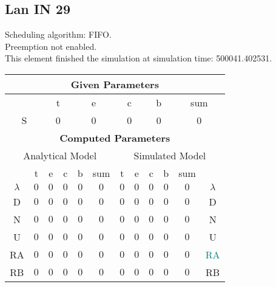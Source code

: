 \documentclass{article}
\begin{document}
\subsection{Lan IN 29}
Scheduling algorithm: FIFO.\\Preemption not enabled. \\This element finished the simulation at simulation time: 500041.402531.\\
\begin{table}[H]\centering\begin{tabular}{@{}c|cccc|c||cccc|c|c@{}}\toprule\multicolumn{12}{c}{\textbf{Given Parameters}}\\\midrule\multicolumn{2}{c|}{ } & \multicolumn{2}{c}{t} & \multicolumn{2}{c}{e} & \multicolumn{2}{c}{c} & \multicolumn{2}{c}{b} & \multicolumn{2}{|c}{sum} \\ \midrule\multicolumn{2}{c|}{S} & \multicolumn{2}{c}{0} & \multicolumn{2}{c}{0} & \multicolumn{2}{c}{0} & \multicolumn{2}{c}{0} & \multicolumn{2}{|c}{0}\\ \midrule\midrule\multicolumn{12}{c}{\textbf{Computed Parameters}}\\ \midrule\multicolumn{6}{c||}{Analytical Model} & \multicolumn{6}{c}{Simulated Model}\\ 
 \midrule & t & e & c & b & sum & t & e & c & b & sum &  \\ \midrule$\lambda$ &$0$ & $0$ & $0$ & $0$ & $0$ & $0$ & $0$ & $0$ & $0$ & $0$& $\lambda$ \\D & $0$ & $0$ & $0$ & $0$ & $0$ & $0$ & $0$ & $0$ & $0$ & $0$& D\\N & $0$ & $0$ & $0$ & $0$ & $0$ & $0$ & $0$ & $0$ & $0$ & $0$& N\\U & $0$ & $0$ & $0$ & $0$ & $0$ & $0$ & $0$ & $0$ & $0$ & $0$& U\\RA & $0$ & $0$ & $0$ & $0$ & $0$ & $0$ & $0$ & $0$ & $0$ & $0$& \textcolor{teal}{RA}\\RB & $0$ & $0$ & $0$ & $0$ & $0$ & $0$ & $0$ & $0$ & $0$ & $0$& RB\\
\bottomrule
\end{tabular}
\end{table}
\filbreak
\end{document}
